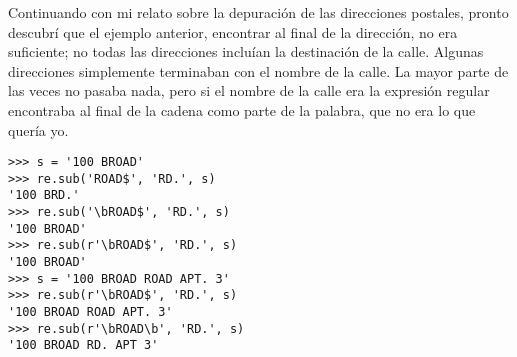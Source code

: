
Continuando con mi relato sobre la depuración de las direcciones postales, pronto descubrí que el ejemplo anterior, encontrar  al final de la dirección, no era suficiente; no todas las direcciones incluían la destinación de la calle. Algunas direcciones simplemente terminaban con el nombre de la calle. La mayor parte de las veces no pasaba nada, pero si el nombre de la calle era  la expresión regular encontraba  al final de la cadena como parte de la palabra, que no era lo que quería yo.

\noindent\begin{minipage}{\textwidth}
\begin{lstlisting}[mathescape=False]
>>> s = '100 BROAD'
>>> re.sub('ROAD$', 'RD.', s)
'100 BRD.'
>>> re.sub('\bROAD$', 'RD.', s)
'100 BROAD'
>>> re.sub(r'\bROAD$', 'RD.', s)
'100 BROAD'
>>> s = '100 BROAD ROAD APT. 3'
>>> re.sub(r'\bROAD$', 'RD.', s)
'100 BROAD ROAD APT. 3'
>>> re.sub(r'\bROAD\b', 'RD.', s)
'100 BROAD RD. APT 3'
\end{lstlisting}
\end{minipage}


